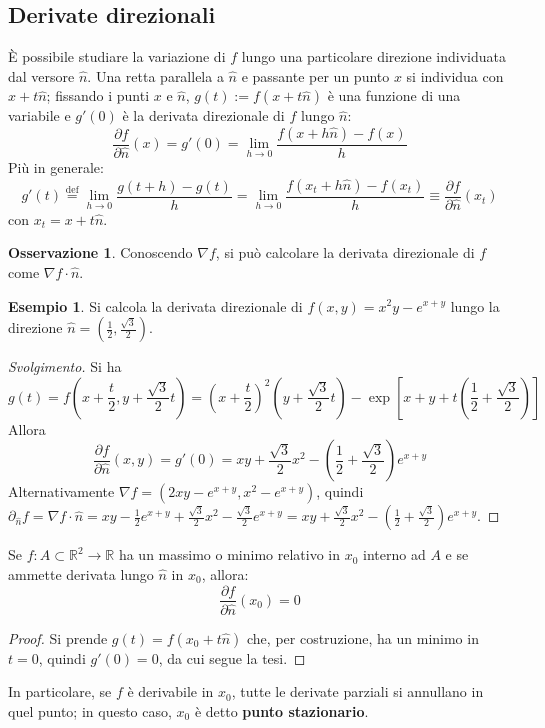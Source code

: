 \documentclass[10pt, a4paper]{scrartcl}
\newenvironment{svolgimento}{\renewcommand\qedsymbol{$\blacksquare$}\begin{proof}[Svolgimento]}{\end{proof}}
\theoremstyle{definition}
\newtheorem{esempio}{Esempio}
\numberwithin{esempio}{section}
\theoremstyle{definition}
\newtheorem{obs}{Osservazione}
\numberwithin{obs}{section}
\numberwithin{nota}{section}
\numberwithin{equation}{subsection}
\begin{document}
\subsection{Derivate direzionali}

\`E possibile studiare la variazione di $f$ lungo una particolare direzione individuata dal versore $\hat{n}$. Una retta parallela a $\hat{n}$ e passante per un punto $x$ si individua con $x+t \hat{n}$; fissando i punti $x$ e $\hat{n}$, $g(t) := f(x+t\hat{n})$ \`e una funzione di una variabile e $g'(0)$ \`e la derivata direzionale di $f$ lungo $\hat{n}$:
\begin{equation}
	\frac{\partial f}{\partial \hat{n}} (x) = g'(0) = \lim_{h \to 0} \frac{f(x+h\hat{n}) - f(x)}{h}
\end{equation}
Pi\`u in generale:
\begin{equation}
	g'(t) \overset{\text{def}}{=} \lim_{h \to 0} \frac{g(t+h) - g(t)}{h} = \lim_{h \to 0} \frac{f(x_t+ h \hat{n}) - f(x_t)}{h} \equiv \frac{\partial f}{\partial \hat{n}} (x_t)
\end{equation}
con $x_t = x+t \hat{n}$. 
\begin{obs}
	Conoscendo $\nabla f$, si pu\`o calcolare la derivata direzionale di $f$ come $\nabla f \cdot \hat{n}$.
\end{obs}
\begin{esempio}
	Si calcola la derivata direzionale di $f(x,y) = x^2 y - e^{x+y} $ lungo la direzione $\hat{n} = \left(\frac{1}{2}, \frac{\sqrt{3} }{2}\right) $.
	\begin{svolgimento}
		Si ha 
		\[
		g(t) = f\left(x + \frac{t}{2}, y + \frac{\sqrt{3} }{2}t\right) = \left(x + \frac{t}{2}\right) ^2 \left(y + \frac{\sqrt{3} }{2}t\right) - \exp \left[ x + y + t\left(\frac{1}{2} + \frac{\sqrt{3} }{2}\right)  \right] 
		\] 
		Allora 
		\[
		\frac{\partial f}{\partial \hat{n}} (x,y) = g'(0) = xy + \frac{\sqrt{3} }{2}x^2 - \left(\frac{1}{2}+ \frac{\sqrt{3} }{2} \right) e^{x+y} 
		\] 
		Alternativamente $\nabla f = \left(2xy - e^{x+y} , x^2 - e^{x+y} \right) $, quindi $\partial _{\hat{n}} f = \nabla f \cdot \hat{n} =xy - \frac{1}{2} e^{x+y} +\frac{\sqrt{3} }{2} x^2 - \frac{\sqrt{3} }{2}e^{x+y} = xy + \frac{\sqrt{3} }{2}x^2 - \left(\frac{1}{2}+\frac{\sqrt{3} }{2}\right) e^{x+y}   $.
	\end{svolgimento}
\end{esempio}
\begin{teorema}
	{}{}
	Se $f:A\subset \mathbb{R}^2 \to  \mathbb{R}$ ha un massimo o minimo relativo in $x_0$ interno ad $A$ e se ammette derivata lungo $\hat{n}$ in $x_0$, allora:
	\begin{equation}
		\frac{\partial f}{\partial \hat{n}} (x_0)= 0 
	\end{equation}
	\begin{proof}
		Si prende $g(t) = f(x_0 + t \hat{n})$ che, per costruzione, ha un minimo in $t=0$, quindi $g'(0) = 0$, da cui segue la tesi.
	\end{proof}
\end{teorema}
\noindent In particolare, se $f$ \`e derivabile in $x_0$, tutte le derivate parziali si annullano in quel punto; in questo caso, $x_0$ \`e detto \textbf{punto stazionario}.
\end{document}
